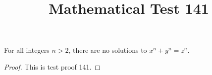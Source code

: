 \documentclass{amsart}
\begin{document}
\title{Mathematical Test 141}
\begin{theorem}
For all integers $n > 2$, there are no solutions to $x^n + y^n = z^n$.
\end{theorem}
\begin{proof}
This is test proof 141.
\end{proof}
\end{document}
